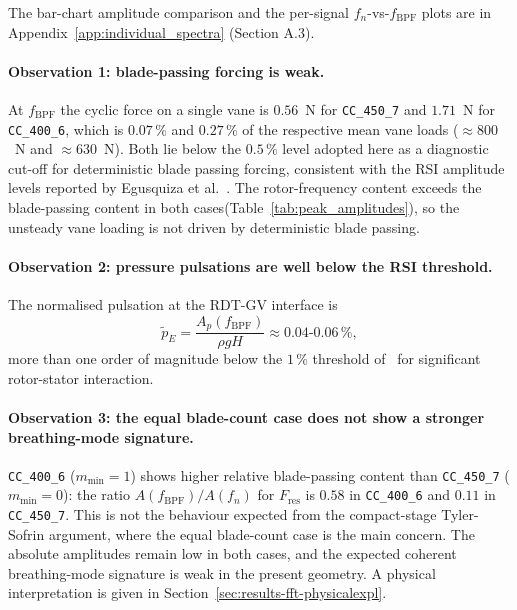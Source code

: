 The bar-chart amplitude comparison and the per-signal $f_n$-vs-$f_{\mathrm{BPF}}$ plots are in Appendix~\ref{app:individual_spectra} (Section A.3).

\paragraph{Observation 1: blade-passing forcing is weak.} At $f_{\mathrm{BPF}}$ the cyclic force on a single vane is $0.56$~N for \texttt{CC\_450\_7} and $1.71$~N for \texttt{CC\_400\_6}, which is $0.07\,\%$ and $0.27\,\%$ of the respective mean vane loads ($\approx 800$~N and $\approx 630$~N). Both lie below the $0.5\,\%$ level adopted here as a diagnostic cut-off for deterministic blade passing forcing, consistent with the RSI amplitude levels reported by Egusquiza et al.~\cite{Egusquiza2006}. The rotor-frequency content exceeds the blade-passing content in both cases(Table~\ref{tab:peak_amplitudes}), so the unsteady vane loading is not driven by deterministic blade passing.

\paragraph{Observation 2: pressure pulsations are well below the RSI threshold.}
The normalised pulsation at the RDT-GV interface is
\begin{equation}
    \tilde{p}_{E}
    = \frac{A_p(f_{\mathrm{BPF}})}{\rho g H}
    \approx 0.04\text{-}0.06\,\%,
    \label{eq:normalised-pulsation}
\end{equation}
more than one order of magnitude below the $1\,\%$ threshold of~\cite{Brekke2001,Brekke2010} for significant rotor-stator interaction.

\paragraph{Observation 3: the equal blade-count case does not show a stronger breathing-mode signature.}
\texttt{CC\_400\_6} ($m_{\min} = 1$) shows higher relative blade-passing content than \texttt{CC\_450\_7} ($m_{\min} = 0$): the ratio $A(f_{\mathrm{BPF}})/A(f_n)$ for $F_{\mathrm{res}}$ is $0.58$ in \texttt{CC\_400\_6} and $0.11$ in \texttt{CC\_450\_7}. This is not the behaviour expected from the compact-stage Tyler-Sofrin argument, where the equal blade-count case is the main concern. The absolute amplitudes remain low in both cases, and the expected coherent breathing-mode signature is weak in the present geometry. A physical interpretation is given in Section~\ref{sec:results-fft-physicalexpl}.


